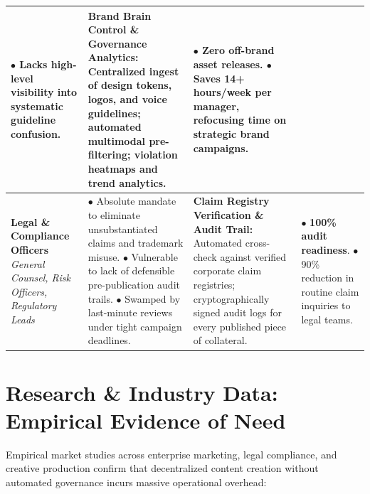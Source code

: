 \documentclass[10pt,a4paper]{article}
\begin{document}
\begin{table}[h!]
\begin{tabularx}{\textwidth}{p{2.8cm}X p{4.2cm} p{3.2cm}}
$\bullet$ Lacks high-level visibility into systematic guideline confusion. & 
\textbf{Brand Brain Control \& Governance Analytics:}\newline
Centralized ingest of design tokens, logos, and voice guidelines; automated multimodal pre-filtering; violation heatmaps and trend analytics. & 
$\bullet$ \textbf{Zero} off-brand asset releases.\newline
$\bullet$ Saves 14+ hours/week per manager, refocusing time on strategic brand campaigns. \\
\midrule
\textbf{Legal \& Compliance Officers}\newline
\textit{General Counsel, Risk Officers, Regulatory Leads} & 
$\bullet$ Absolute mandate to eliminate unsubstantiated claims and trademark misuse.\newline
$\bullet$ Vulnerable to lack of defensible pre-publication audit trails.\newline
$\bullet$ Swamped by last-minute reviews under tight campaign deadlines. & 
\textbf{Claim Registry Verification \& Audit Trail:}\newline
Automated cross-check against verified corporate claim registries; cryptographically signed audit logs for every published piece of collateral. & 
$\bullet$ \textbf{100\% audit readiness}.\newline
$\bullet$ 90\% reduction in routine claim inquiries to legal teams. \\
\bottomrule
\end{tabularx}
\end{table}

\vspace{0.1cm}

\section{Research \& Industry Data: Empirical Evidence of Need}

\small Empirical market studies across enterprise marketing, legal compliance, and creative production confirm that decentralized content creation without automated governance incurs massive operational overhead:
\end{document}

